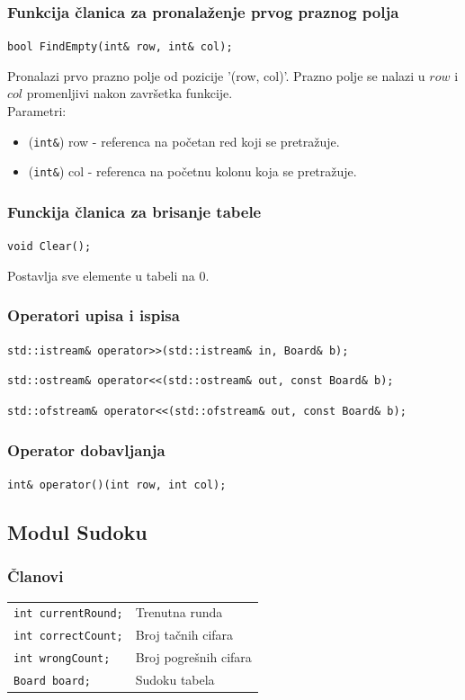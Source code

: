 \documentclass[a4paper]{article}
\begin{document}
    \subsubsection{Funkcija članica za pronalaženje prvog praznog polja}
	\texttt{bool FindEmpty(int\& row, int\& col);}
    \par Pronalazi prvo prazno polje od pozicije '(row, col)'. Prazno polje se nalazi u $row$ i $col$ promenljivi nakon završetka funkcije.\\
    Parametri:
    \begin{itemize}
        \item (\texttt{int\&}) row - referenca na početan red koji se pretražuje.
        \item (\texttt{int\&}) col - referenca na početnu kolonu koja se pretražuje.
    \end{itemize}

    \subsubsection{Funckija članica za brisanje tabele}
    \texttt{void Clear();}
    \par Postavlja sve elemente u tabeli na 0.

    \subsubsection{Operatori upisa i ispisa}
    \par\texttt{std::istream\& operator>>(std::istream\& in, Board\& b);}
    \par\texttt{std::ostream\& operator<<(std::ostream\& out, const Board\& b);}
    \par\texttt{std::ofstream\& operator<<(std::ofstream\& out, const Board\& b);}
    
    \subsubsection{Operator dobavljanja}
    \par\texttt{int\& operator()(int row, int col);}
    
    \subsection{Modul Sudoku}
    
    \subsubsection{Članovi}
    \begin{tabular}{ l l }
        \texttt{int currentRound;} & Trenutna runda\\
        \texttt{int correctCount;} & Broj tačnih cifara\\
        \texttt{int wrongCount;} & Broj pogrešnih cifara\\
        \texttt{Board board;} & Sudoku tabela\\
    \end{tabular}
    
\end{document}
